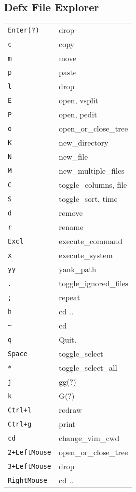 \begin{multicols}{3}
\section{Defx File Explorer}
\begin{tabular}{@{}ll@{}}
    \verb!Enter(?)! & drop \\
	\verb!c! & copy \\
	\verb!m! & move \\
	\verb!p! & paste \\
	\verb!l! & drop \\
	\verb!E! & open, vsplit \\
	\verb!P! & open, pedit \\
	\verb!o! & open\_or\_close\_tree \\
	\verb!K! & new\_directory \\
	\verb!N! & new\_file \\
	\verb!M! & new\_multiple\_files \\
    \verb!C! & toggle\_columns, file \\
    \verb!S! & toggle\_sort, time \\
	\verb!d! & remove \\
	\verb!r! & rename \\
    \verb!Excl! &  execute\_command \\
	\verb!x! & execute\_system \\
	\verb!yy! & yank\_path \\
	\verb!.! & toggle\_ignored\_files \\
	\verb!;! & repeat \\
	\verb!h! & cd .. \\
	\verb!~! & cd \\
	\verb!q! & Quit. \\
	\verb!Space! & toggle\_select \\
	\verb!*! & toggle\_select\_all \\
    \verb!j! & gg(?) \\
    \verb!k! & G(?) \\
	\verb!Ctrl+l! & redraw \\
	\verb!Ctrl+g! & print \\
	\verb!cd! & change\_vim\_cwd \\
	\verb!2+LeftMouse! & open\_or\_close\_tree \\
	\verb!3+LeftMouse! & drop \\
	\verb!RightMouse! & cd .. \\
\end{tabular}


\end{multicols}
